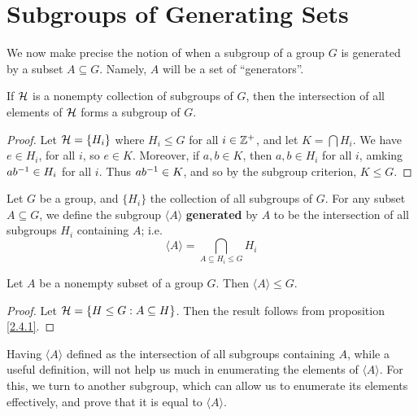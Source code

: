 \section{Subgroups of Generating Sets}
\label{section_2.4}

We now make precise the notion of when a subgroup of a group $G$ is generated by
a subset $A \subseteq G$. Namely, $A$ will be a set of ``generators''.

\begin{proposition}\label{proposition_2.4.1}
  If $\mathcal{H}$ is a nonempty collection of subgroups of  $G$, then the
  intersection of all elements of $\mathcal{H}$ forms a subgroup of $G$.
\end{proposition}
\begin{proof}
  Let $\mathcal{H}=\{H_i\}$ where $H_i \leq G$ for all  $i \in \mathbb{Z}^+$, and let
  $K=\bigcap{H_i}$. We have $e \in H_i$, for all  $i$, so  $e \in K$.
  Moreover, if  $a,b \in K$, then  $a,b \in H_i$ for all $i$, amking
  $ab^{-1} \in H_i$ for all $i$. Thus  $ab^{-1} \in K$, and so by the
  subgroup criterion, $K \leq G$.
\end{proof}

\begin{definition}
  Let $G$ be a group, and  $\{H_i\}$ the collection of all subgroups of $G$.
  For any subset  $A \subseteq G$, we define the subgroup $\langle A
  \rangle$ \textbf{generated} by $A$ to be the intersection of all
  subgroups $H_i$ containing  $A$; i.e.
  \begin{equation}
    \langle A \rangle=\bigcap_{A \subseteq H_i \leq G}{H_i}
  \end{equation}
\end{definition}

\begin{proposition}\label{proposition_2.4.2}
  Let $A$ be a nonempty subset of a group  $G$. Then  $\langle A
  \rangle \leq G$.
\end{proposition}
\begin{proof}
  Let $\mathcal{H}=\{H \leq G : A \subseteq H\}$. Then the result follows from proposition
  \ref{2.4.1}.
\end{proof}

Having $\langle A \rangle$ defined as the intersection of all subgroups
containing $A$, while a useful definition, will not help us much in enumerating
the elements of $\langle A \rangle$. For this, we turn to another subgroup, which
can allow us to enumerate its elements effectively, and prove that it is equal
to $\langle A \rangle$.

